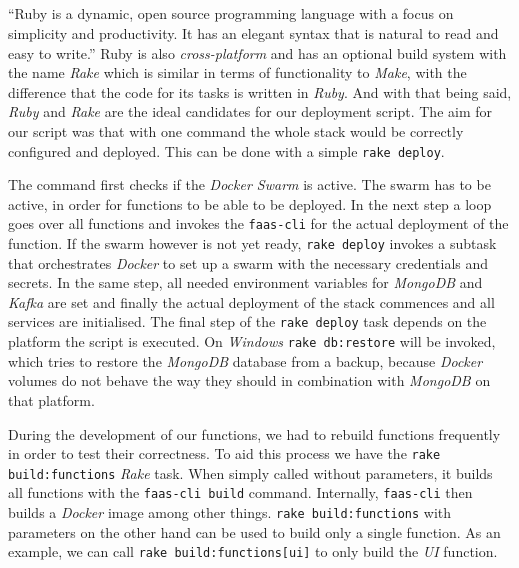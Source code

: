 \subsection{}

“Ruby is a dynamic, open source programming language with a focus on simplicity and productivity. It
has an elegant syntax that is natural to read and easy to write.” \cite{ruby} Ruby is also
\textit{cross-platform} and has an optional build system with the name \textit{Rake} which is
similar in terms of functionality to \textit{Make}, with the difference that the code for its tasks
is written in \textit{Ruby}. And with that being said, \textit{Ruby} and \textit{Rake} are the ideal
candidates for our deployment script. The aim for our script was that with one command the whole
stack would be correctly configured and deployed. This can be done with a simple
\lstinline{rake deploy}.

The command first checks if the \textit{Docker Swarm} is active. The swarm has to be active, in
order for functions to be able to be deployed. In the next step a loop goes over all functions and
invokes the \texttt{faas-cli} for the actual deployment of the function. If the swarm however is not
yet ready, \lstinline{rake deploy} invokes a subtask that orchestrates \textit{Docker} to set up a
swarm with the necessary credentials and secrets. In the same step, all needed environment variables
for \textit{MongoDB} and \textit{Kafka} are set and finally the actual deployment of the stack
commences and all services are initialised. The final step of the \lstinline{rake deploy} task
depends on the platform the script is executed. On \textit{Windows} \lstinline{rake db:restore} will
be invoked, which tries to restore the \textit{MongoDB} database from a backup, because
\textit{Docker} volumes do not behave the way they should in combination with \textit{MongoDB} on
that platform.

During the development of our functions, we had to rebuild functions frequently in order to test
their correctness. To aid this process we have the \lstinline{rake build:functions} \textit{Rake}
task. When simply called without parameters, it builds all functions with the \texttt{faas-cli
build} command. Internally, \texttt{faas-cli} then builds a \textit{Docker} image among other
things. \lstinline{rake build:functions} with parameters on the other hand can be used to build only
a single function. As an example, we can call \lstinline{rake build:functions[ui]} to only build the
\textit{UI} function.

